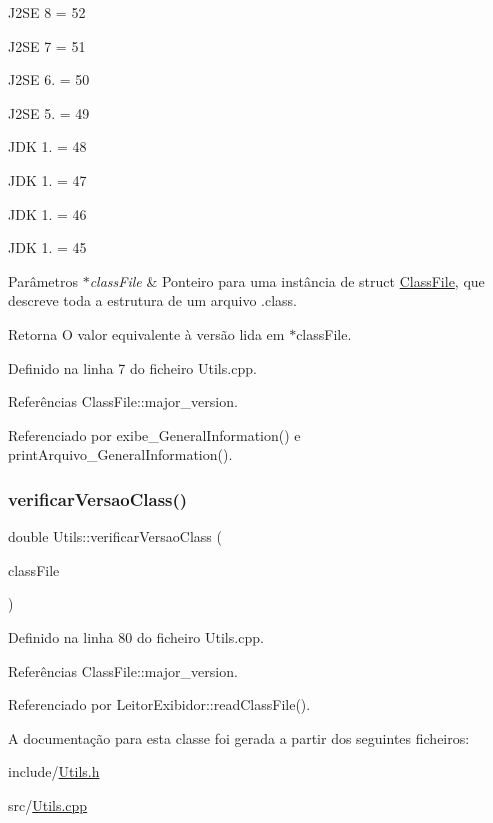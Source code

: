 J2\+SE 8 = 52

J2\+SE 7 = 51

J2\+SE 6. = 50

J2\+SE 5. = 49

J\+DK 1. = 48

J\+DK 1. = 47

J\+DK 1. = 46

J\+DK 1. = 45 
\begin{DoxyParams}{Parâmetros}
{\em $\ast$class\+File} & Ponteiro para uma instância de struct {\ttfamily \hyperlink{classClassFile}{Class\+File}}, que descreve toda a estrutura de um arquivo .class. \\
\hline
\end{DoxyParams}
\begin{DoxyReturn}{Retorna}
O valor equivalente à versão lida em $\ast$class\+File. 
\end{DoxyReturn}


Definido na linha 7 do ficheiro Utils.\+cpp.



Referências Class\+File\+::major\+\_\+version.



Referenciado por exibe\+\_\+\+General\+Information() e print\+Arquivo\+\_\+\+General\+Information().

\mbox{\label{classUtils_a71459ff272f47bbce2081ff59fae2d2c}} 
\subsubsection{\texorpdfstring{verificar\+Versao\+Class()}{verificarVersaoClass()}}
{\footnotesize\ttfamily double Utils\+::verificar\+Versao\+Class (\begin{DoxyParamCaption}\item[{\hyperlink{classClassFile}{Class\+File} $\ast$}]{class\+File }\end{DoxyParamCaption})\hspace{0.3cm}{\ttfamily [static]}}



Definido na linha 80 do ficheiro Utils.\+cpp.



Referências Class\+File\+::major\+\_\+version.



Referenciado por Leitor\+Exibidor\+::read\+Class\+File().



A documentação para esta classe foi gerada a partir dos seguintes ficheiros\+:\begin{DoxyCompactItemize}
\item 
include/\hyperlink{Utils_8h}{Utils.\+h}\item 
src/\hyperlink{Utils_8cpp}{Utils.\+cpp}\end{DoxyCompactItemize}

